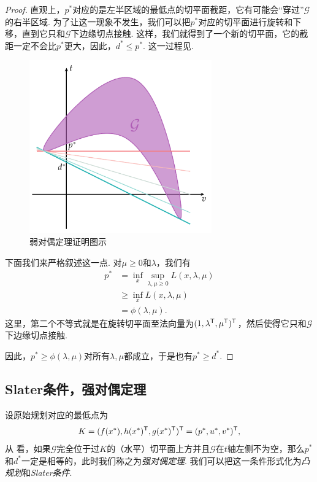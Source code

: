 \begin{proof}
    直观上，$p^*$对应的是左半区域的最低点的切平面截距，它有可能会“穿过”$\mathcal{G}$的右半区域. 为了让这一现象不发生，我们可以把$p^*$对应的切平面进行旋转和下移，直到它只和$\mathcal{G}$下边缘切点接触. 这样，我们就得到了一个新的切平面，它的截距一定不会比$p^*$更大，因此，$d^*\leq p^*$. 这一过程见.

    \begin{figure}[ht]
        \centering
        \includegraphics[width=0.7\textwidth]{figures/duality/weak-duality.pdf}
        \caption{弱对偶定理证明图示}
        \label{fig:weak-duality}    
    \end{figure}

    下面我们来严格叙述这一点. 对$\mu\geq 0$和$\lambda$，我们有
    \begin{align*}
        p^*&=\inf_{x} \sup_{\lambda,\mu\geq 0} L(x,\lambda,\mu)\\
           &\geq \inf_{x} L(x,\lambda,\mu)\\
           &=\phi(\lambda,\mu).       
    \end{align*}
    这里，第二个不等式就是在旋转切平面至法向量为$(1,\lambda^{\mathsf{T}},\mu^{\mathsf{T}})^{\mathsf{T}}$，然后使得它只和$\mathcal{G}$下边缘切点接触. 
    
    因此，$p^*\geq \phi(\lambda,\mu)$对所有$\lambda,\mu$都成立，于是也有$p^*\geq d^*$.
\end{proof}

\subsection{Slater条件，强对偶定理}

设原始规划对应的最低点为
    \[K=(f(x^*),h(x^*)^{\mathsf{T}},g(x^*)^{\mathsf{T}})^{\mathsf{T}}=(p^*,u^*,v^*)^{\mathsf{T}},\]
从 看，如果$\mathcal G$完全位于过$K$的（水平）切平面上方并且$\mathcal G$在$t$轴左侧不为空，那么$p^*$和$d^*$一定是相等的，此时我们称之为\textit{强对偶定理}. 我们可以把这一条件形式化为\textit{凸规划}和\textit{Slater条件}.

